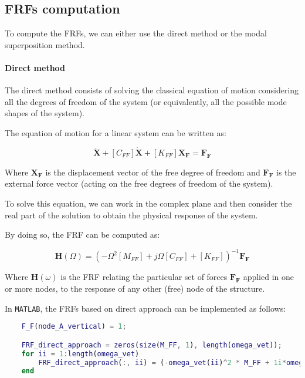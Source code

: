\subsection{FRFs computation}
\label{subsec:FRFs_computation}

To compute the FRFs, we can either use the direct method or the modal superposition method.

\paragraph{Direct method}

The direct method consists of solving the classical equation of motion considering all the degrees of freedom of the system (or equivalently, all the possible mode shapes of the system).

The equation of motion for a linear system can be written as:

\begin{equation}
    [M_{FF}] \mathbf{\ddot{X}} + [C_{FF}] \mathbf{\dot{X}} + [K_{FF}] \mathbf{X_F} = \mathbf{F_F}
\end{equation}

Where $\mathbf{X_F}$ is the displacement vector of the free degree of freedom and $\mathbf{F_F}$ is the external force vector (acting on the free degrees of freedom of the system).

To solve this equation, we can work in the complex plane and then consider the real part of the solution to obtain the physical response of the system.

By doing so, the FRF can be computed as:

\begin{equation}
    \mathbf{H}(\Omega) = (-\Omega^2 [M_{FF}] + j\Omega [C_{FF}] + [K_{FF}])^{-1} \mathbf{F_F}
\end{equation}

Where $\mathbf{H}(\omega)$ is the FRF relating the particular set of forces $\mathbf{F_F}$ applied in one or more nodes, to the response of any other (free) node of the structure.

In \texttt{MATLAB}, the FRFs based on direct approach can be implemented as follows:

\begin{lstlisting}[language=Matlab, caption={MATLAB code to compute the FRFs of the structure using the direct method.}]
    % Here we compute the FRFs due to a vertical force applied to node A with module 1
    F_F(node_A_vertical) = 1;

    FRF_direct_approach = zeros(size(M_FF, 1), length(omega_vet));
    for ii = 1:length(omega_vet)
        FRF_direct_approach(:, ii) = (-omega_vet(ii)^2 * M_FF + 1i*omega_vet(ii) * C_FF + K_FF) \ F_F;
    end
\end{lstlisting}


